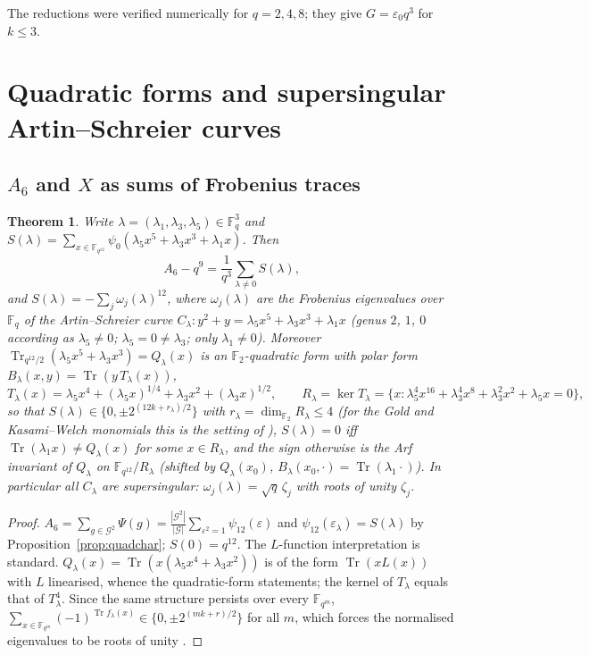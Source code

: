 \documentclass[11pt,a4paper]{amsart}
\newtheorem{theorem}{Theorem}[section]
\theoremstyle{definition}
\newcommand{\F}{\mathbb{F}}
\newcommand{\G}{\mathcal{G}}
\newcommand{\Tr}{\operatorname{Tr}}
\newcommand{\eps}{\varepsilon}
\newcommand{\sgn}{\varepsilon_0}
\begin{document}
The reductions were verified numerically for $q=2,4,8$; they give $G=\sgn q^3$ for $k\le3$.

\section{Quadratic forms and supersingular Artin--Schreier curves}\label{sec:qf}

\subsection{\texorpdfstring{$A_6$ and $X$}{A6 and X} as sums of Frobenius traces}
\begin{theorem}\label{thm:supersing}
Write $\lambda=(\lambda_1,\lambda_3,\lambda_5)\in\F_q^3$ and $S(\lambda)=\sum_{x\in\F_{q^{12}}}\psi_0(\lambda_5x^5+\lambda_3x^3+\lambda_1x)$. Then
\begin{equation}\label{eq:A6S}
A_6-q^9=\frac1{q^3}\sum_{\lambda\ne0}S(\lambda),
\end{equation}
and $S(\lambda)=-\sum_j\omega_j(\lambda)^{12}$, where $\omega_j(\lambda)$ are the Frobenius eigenvalues over $\F_q$ of the Artin--Schreier curve $C_\lambda:y^2+y=\lambda_5x^5+\lambda_3x^3+\lambda_1x$ (genus $2$, $1$, $0$ according as $\lambda_5\ne0$; $\lambda_5=0\ne\lambda_3$; only $\lambda_1\ne0$). Moreover $\Tr_{q^{12}/2}(\lambda_5x^5+\lambda_3x^3)=Q_\lambda(x)$ is an $\F_2$-quadratic form with polar form $B_\lambda(x,y)=\Tr(y\,T_\lambda(x))$,
\[
T_\lambda(x)=\lambda_5x^4+(\lambda_5x)^{1/4}+\lambda_3x^2+(\lambda_3x)^{1/2},\qquad
R_\lambda=\ker T_\lambda=\{x:\lambda_5^4x^{16}+\lambda_3^4x^8+\lambda_3^2x^2+\lambda_5x=0\},
\]
so that $S(\lambda)\in\{0,\pm2^{(12k+r_\lambda)/2}\}$ with $r_\lambda=\dim_{\F_2}R_\lambda\le4$ (for the Gold and Kasami--Welch monomials this is the setting of \cite{LMW}), $S(\lambda)=0$ iff $\Tr(\lambda_1x)\ne Q_\lambda(x)$ for some $x\in R_\lambda$, and the sign otherwise is the Arf invariant of $Q_\lambda$ on $\F_{q^{12}}/R_\lambda$ (shifted by $Q_\lambda(x_0)$, $B_\lambda(x_0,\cdot)=\Tr(\lambda_1\cdot)$). In particular all $C_\lambda$ are supersingular: $\omega_j(\lambda)=\sqrt q\,\zeta_j$ with roots of unity $\zeta_j$.
\end{theorem}
\begin{proof}
$A_6=\sum_{g\in\G^2}\Psi(g)=\frac{|\G^2|}{|\G|}\sum_{\eps^2=1}\psi_{12}(\eps)$ and $\psi_{12}(\eps_\lambda)=S(\lambda)$ by Proposition~\ref{prop:quadchar}; $S(0)=q^{12}$. The $L$-function interpretation is standard. $Q_\lambda(x)=\Tr(x(\lambda_5x^4+\lambda_3x^2))$ is of the form $\Tr(xL(x))$ with $L$ linearised, whence the quadratic-form statements; the kernel of $T_\lambda$ equals that of $T_\lambda^4$. Since the same structure persists over every $\F_{q^m}$, $\sum_{x\in\F_{q^m}}(-1)^{\Tr f_\lambda(x)}\in\{0,\pm2^{(mk+r)/2}\}$ for all $m$, which forces the normalised eigenvalues to be roots of unity \cite{GV}.
\end{proof}
\end{document}
